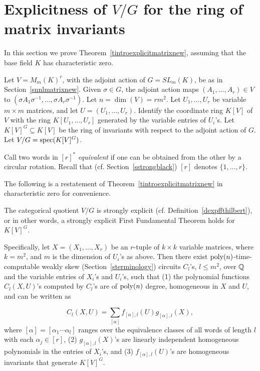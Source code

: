 \documentclass[11pt]{article}
\begin{document}
%
%
\section{Explicitness of $V/G$ for  the ring of matrix invariants} \label{sexpmatrixring}
In this section we prove Theorem~\ref{tintroexplicitmatrixnew}, assuming that the base field $K$ has characteristic zero.


Let $V=M_m(K)^r$, with the adjoint action of $G=SL_m(K)$, be as in Section~\ref{snnlmatrixnew}.
Given $\sigma \in G$, the adjoint action maps $(A_1,\ldots,A_r) \in V$ to 
$(\sigma A_1 \sigma^{-1}, \ldots, \sigma A_r \sigma^{-1})$.
Let $n=\dim(V)=r m^2$. Let $U_1,\ldots,U_r$ be variable $m\times m$ matrices, and let
$U=(U_1,\ldots,U_r)$. Identify
the coordinate ring $K[V]$ of $V$ with 
the ring $K[U_1,\ldots,U_r]$ generated by the variable entries of $U_i$'s. 
Let $K[V]^G \subseteq K[V]$ be the ring of invariants with respect to the adjoint action of $G$.
Let $V/G={\mbox {spec}}(K[V]^G)$.  


Call two words in $[r]^*$
 {\em equivalent} if one can be obtained from the other by a circular rotation. Recall that 
(cf. Section~\ref{sstrongblack}) $[r]$ denotes $\{1,\ldots,r\}$.

The following is a restatement of Theorem~\ref{tintroexplicitmatrixnew} in characteristic zero for convenience.

\begin{theorem} \label{texplicitmatrix}
The categorical quotient  $V/G$ is strongly explicit (cf. Definition~\ref{dexpffthilbert}), or in other words,
a strongly explicit First Fundamental Theorem holds for $K[V]^G$.

Specifically, let $X=(X_1,\ldots,X_r)$ be an $r$-tuple of  $k\times k$ variable matrices, where $k=m^2$,
and $m$ is the dimension of $U_i$'s as above.
Then there exist ${\mbox {poly}}(n)$-time-computable weakly skew (Section~\ref{sterminology}) 
circuits $C_l$'s, $l \le m^2$,  
over $\mathbb{Q}$ and the variable entries of $X_i$'s and $U_i$'s,
such that
(1) the polynomial functions $C_l(X,U)$'s computed by $C_l$'s are of ${\mbox {poly}}(n)$ degree,  homogeneous in $X$ and $U$,
and can be written as 

\begin{equation} \label{eqclxu}
C_l(X,U)=\sum_{[\alpha]}  f_{[\alpha],l} (U) g_{[\alpha],l} (X) , 
\end{equation}
where $[\alpha]=[\alpha_1 \cdots \alpha_l]$ ranges over the equivalence classes of all words of length $l$ with each $\alpha_j \in [r]$,
(2) $g_{[\alpha],l}(X)$'s are linearly independent homogeneous polynomials in the entries of $X_i$'s, 
and (3) $f_{[\alpha],l}(U)$'s are homogeneous invariants that generate $K[V]^G$.
\end{theorem} 
\end{document}
